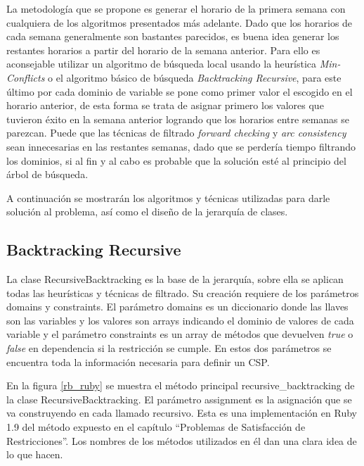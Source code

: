 La metodolog\'ia que se propone es generar el horario de la primera semana con cualquiera de los algoritmos presentados m\'as adelante. Dado que los horarios de cada semana generalmente son bastantes parecidos, es buena idea generar los restantes horarios a partir del horario de la semana anterior. Para ello es aconsejable utilizar un algoritmo de b\'usqueda local usando la heur\'istica \emph{Min-Conflicts} o el algoritmo b\'asico de b\'usqueda \emph{Backtracking Recursive}, para este \'ultimo por cada dominio de variable se pone como primer valor el escogido en el horario anterior, de esta forma se trata de asignar primero los valores que tuvieron \'exito en la semana anterior logrando que los horarios entre semanas se parezcan. Puede que las t\'ecnicas de filtrado \emph{forward checking} y \emph{arc consistency} sean innecesarias en las restantes semanas, dado que se perder\'ia tiempo filtrando los dominios, si al fin y al cabo es probable que la soluci\'on est\'e al principio del \'arbol de b\'usqueda.

A continuaci\'on se mostrar\'an los algoritmos y t\'ecnicas utilizadas para darle soluci\'on al problema, as\'i como el diseño de la jerarqu\'ia de clases.

\subsection{Backtracking Recursive}

La clase \textsf{RecursiveBacktracking} es la base de la jerarqu\'ia, sobre ella se aplican todas las heur\'isticas y t\'ecnicas de filtrado. Su creaci\'on requiere de los par\'ametros \textsf{domains} y \textsf{constraints}. El par\'ametro \textsf{domains} es un diccionario donde las llaves son las variables y los valores son arrays indicando el dominio de valores de cada variable y el par\'ametro \textsf{constraints} es un array de m\'etodos que devuelven \emph{true} o \emph{false} en dependencia si la restricci\'on se cumple. En estos dos par\'ametros se encuentra toda la informaci\'on necesaria para definir un CSP.

En la figura \ref{rb_ruby} se muestra el m\'etodo principal \textsf{recursive\_backtracking} de la clase \textsf{RecursiveBacktracking}. El par\'ametro \textsf{assignment} es la asignaci\'on que se va construyendo en cada llamado recursivo. Esta es una implementaci\'on en Ruby 1.9 del m\'etodo expuesto en el cap\'itulo ``Problemas de Satisfacci\'on de Restricciones''. Los nombres de los m\'etodos utilizados en \'el dan una clara idea de lo que hacen.

